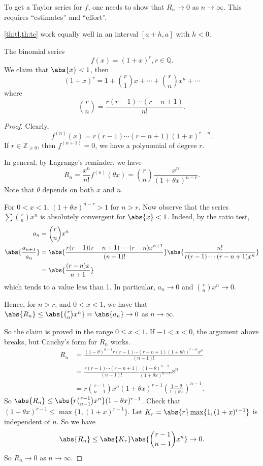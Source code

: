 To get a Taylor series for \(f\), one needs to show that \(R_n \to 0\) as \(n \to \infty\). This requires ``estimates'' and ``effort''.
\begin{remark}
    \cref{th:tl,th:tc} work equally well in an interval \([a + h, a]\) with \(h < 0\).
\end{remark}
\begin{example}
    The binomial series
    \[
        f(x) = (1 + x)^r, r\in \mathbb{Q}.
    \]
    We claim that \(\abs{x}< 1\), then
    \[
        (1 + x)^r = 1 + \binom{r}{1}x + \cdots + \binom{r}{n}x^n + \cdots
    \]
    where
    \[
        \binom{r}{n} = \frac{r(r-1)\cdots (r - n + 1)}{n!}.
    \]
    \begin{proof}
        Clearly,
        \[
            f^{(n)}(x) = r(r - 1) \cdots (r - n + 1)(1 + x)^{r-n}.
        \]
        If \(r\in \mathbb{Z}_{\geq 0}\), then \(f^{(n+1)}=0\), we have a polynomial of degree \(r\).

        In general, by Lagrange's reminder, we have
        \[
            R_n = \frac{x^n}{n!}f^{(n)}(\theta x) = \binom{r}{n}\frac{x^n}{(1+\theta x)^{n - r}}.
        \]
        Note that \(\theta\) depends on both \(x\) and \(n\).

        For \(0 < x < 1\), \((1 + \theta x)^{n - r} > 1\) for \(n > r\). Now observe that the series \(\sum \binom{r}{n}x^n\) is absolutely convergent for \(\abs{x} < 1\). Indeed, by the ratio test,
        \begin{align*}
            a_n &= \binom{r}{n}x^n\\
            \abs{\frac{a_{n+1}}{a_n}} &= \abs{\frac{r(r-1)(r-n+1)\cdots(r-n)x^{n+1}}{(n+1)!}} \abs{\frac{n!}{r(r-1)\cdots (r-n+1)x^n}}\\
            &=\abs{\frac{(r-n)x}{n+1}}
        \end{align*}
        which tends to a value less than 1. In particular, \(a_n \to 0\) and \(\binom{r}{n}x^n \to 0\).

        Hence, for \(n > r\), and \( 0 < x < 1\), we have that \(\abs{R_n} \leq \abs{\binom{r}{n}x^n}  = \abs{a_n} \to 0\) as \(n \to \infty\).

        So the claim is proved in the range \( 0 \leq x < 1\). If \(-1 < x <0\), the argument above breaks, but Cauchy's form for \(R_n\) works.
        \begin{align*}
            R_n &= \frac{(1-\theta)^{n-1}r(r-1)\cdots(r-n+1)(1+\theta h)^{r-n}x^n}{(n-1)!}\\
            &= \frac{r(r-1) \cdots (r-n+1)}{(n-1)!}\frac{(1-\theta)^{n-1}}{(1+\theta x)^{n-r}}x^n\\
            &= r \binom{r-1}{n-1}x^n (1+\theta x)^{r-1} (\frac{1 - \theta}{1+\theta x})^{n-1}.
        \end{align*}
        So \(\abs{R_n} \leq \abs{r \binom{r-1}{n-1}x^n} (1 + \theta x)^{r-1}\). Check that \((1 + \theta x)^{r-1} \leq \mathop{\max}\{1, (1+x)^{r-1}\}\). Let \(K_r = \abs{r} \mathop{\max} \{1, (1+x)^{r-1}\}\) is independent of \(n\). So we have
        \[
            \abs{R_n} \leq \abs{K_r} \abs{\binom{r-1}{n-1}x^n} \to 0.
        \]
        So \(R_n \to 0\) as \(n \to \infty\).
    \end{proof}
\end{example}
